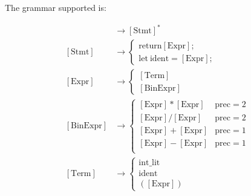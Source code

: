 \documentclass{article}
\begin{document}
The grammar supported is:

\begin{align*}
[\text{Prog}] &\to [\text{Stmt}]^* \\
[\text{Stmt}] &\to
\begin{cases}
\text{return} [\text{Expr}]; \\
\text{let}\ \text{ident} = [\text{Expr}];
\end{cases} \\
[\text{Expr}] &\to
\begin{cases}
[\text{Term}] \\
[\text{BinExpr}]
\end{cases} \\
[\text{BinExpr}] &\to
\begin{cases}
[\text{Expr}] * [\text{Expr}] & \text{prec} = 2 \\
[\text{Expr}] / [\text{Expr}] & \text{prec} = 2 \\
[\text{Expr}] + [\text{Expr}] & \text{prec} = 1 \\
[\text{Expr}] - [\text{Expr}] & \text{prec} = 1 \\
\end{cases} \\
[\text{Term}] &\to
\begin{cases}
\text{int\_lit} \\
\text{ident} \\
([\text{Expr}])
\end{cases}
\end{align*}
\end{document}
